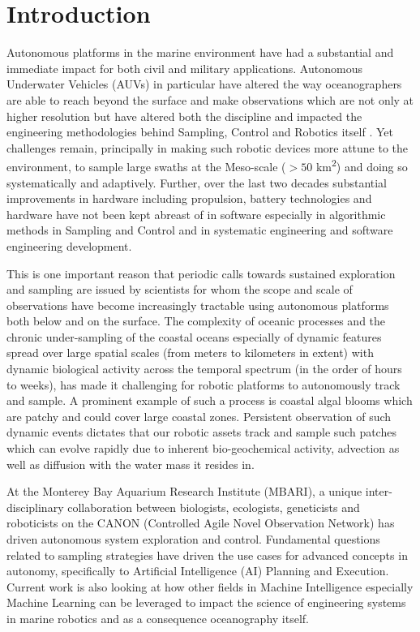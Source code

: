 \section{Introduction}
\label{sec:intro}


Autonomous platforms in the marine environment have had a substantial
and immediate impact for both civil and military
applications. Autonomous Underwater Vehicles (AUVs) in particular have
altered the way oceanographers are able to reach beyond the surface
and make observations which are not only at higher resolution but have
altered both the discipline and impacted the engineering methodologies
behind Sampling, Control and Robotics itself . Yet challenges remain, principally in making
such robotic devices more attune to the environment, to sample large
swaths at the Meso-scale ($> 50$ km\textsuperscript{2}) and doing so
systematically and adaptively. Further, over the last two decades
substantial improvements in hardware including propulsion, battery
technologies and hardware have not been kept abreast of in software
especially in algorithmic methods in Sampling and Control and in
systematic engineering and software engineering development.

This is one important reason that periodic calls towards sustained
exploration and sampling \cite{rudnick03} are issued by scientists for
whom the scope and scale of observations have become increasingly
tractable using autonomous platforms both below and on the
surface. The complexity of oceanic processes and the chronic
under-sampling of the coastal oceans especially of dynamic features
spread over large spatial scales (from meters to kilometers in extent)
with dynamic biological activity across the temporal spectrum (in the
order of hours to weeks), has made it challenging for robotic
platforms to autonomously track and sample. A prominent example of
such a process is coastal algal blooms which are patchy and could
cover large coastal zones. Persistent observation of such dynamic
events dictates that our robotic assets track and sample such patches
which can evolve rapidly due to inherent bio-geochemical activity,
advection as well as diffusion with the water mass it resides in.

At the Monterey Bay Aquarium Research Institute (MBARI), a unique
inter-disciplinary collaboration between biologists, ecologists,
geneticists and roboticists on the CANON (Controlled Agile Novel
Observation Network) \cite{canon} has driven autonomous system
exploration and control. Fundamental questions related to sampling
strategies have driven the use cases for advanced concepts in
autonomy, specifically to Artificial Intelligence (AI) Planning and
Execution. Current work is also looking at how other fields in Machine
Intelligence especially Machine Learning can be leveraged to impact
the science of engineering systems in marine robotics and as a
consequence oceanography itself.


